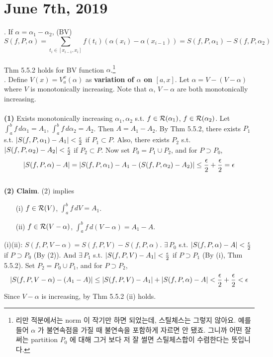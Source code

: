 \section*{June 7th, 2019}
\rmk. If $\alpha = \alpha_1 - \alpha_2$, (BV) $$S(f, P, \alpha) = \sum_{t_i\in [x_{i-1}, x_i]}f(t_i)(\alpha(x_i)-\alpha(x_{i-1})) = S(f, P, \alpha_1) - S(f, P, \alpha_2)$$
\\
 Thm 5.5.2 holds for BV function $\alpha$.\footnote{리만 적분에서는 norm 이 작기만 하면 되었는데, 스틸체스는 그렇지 않아요. 예를 들어 $\alpha$ 가 불연속점을 가질 때 불연속을 포함하게 자르면 안 됐죠. 그니까 어떤 잘 써는 partition $P_0$ 에 대해 그거 보다 저 잘 썰면 스틸체스합이 수렴한다는 뜻입니다.}\\
\pf. Define $V(x) = V_a^x(\alpha)$ as \textbf{variation of $\alpha$ on $ [a, x] $}. Let $\alpha = V - (V-\alpha)$ where $V$ is monotonically increasing. Note that $\alpha$, $V-\alpha$ are both monotonically increasing.\\
\\
\textbf{(1)} Exists monotonically increasing $\alpha_1, \alpha_2$ s.t. $f\in \mathcal{R}(\alpha_1)$, $f\in \mathcal{R}(\alpha_2)$. Let $\int_a^b f\,d\alpha_1 = A_1$, $\int_a^b f\,d\alpha_2 = A_2$. Then $A = A_1-A_2$. By Thm 5.5.2, there exists $P_1$ s.t. $\left|S(f, P, \alpha_1) - A_1\right| < \frac{\epsilon}{2}$ if $P_1\subset P$. Also, there exists $P_2$ s.t. $\left|S(f, P, \alpha_2) - A_2\right| < \frac{\epsilon}{2}$ if $P_2\subset P$. Now set $P_0 = P_1\cup P_2$, and for $P \supset P_0$, 
$$\left|S(f, P, \alpha) - A\right| = \left|S(f, P, \alpha_1)- A_1 -(S(f, P, \alpha_2) - A_2)\right| \leq \frac{\epsilon}{2} + \frac{\epsilon}{2}  =\epsilon$$\\
\textbf{(2)} \textbf{Claim}. (2) implies
\begin{enumerate}
	\item[(i)] $f\in \mathcal{R}(V)$, $\int_a^b f\,dV = A_1$.
	\item[(ii)] $f\in \mathcal{R}(V-\alpha)$, $\int_a^b f\,d(V-\alpha) = A_1 - A$.
\end{enumerate}
(i)\mimp(ii): $S(f, P, V-\alpha) = S(f, P, V) - S(f, P, \alpha)$.
$\exists\,P_0$ s.t. $\left|S(f,P, \alpha) -A\right| < \frac{\epsilon}{2}$ if $P\supset P_0$ (By (2)). And $\exists\,P_1$ s.t. $\left|S(f, P, V)-A_1\right| < \frac{\epsilon}{2}$ if $P\supset P_1$ (By (i), Thm 5.5.2). Set $P_2 = P_0 \cup P_1$, and for $P\supset P_2$,
$$\left|S(f, P, V-\alpha) - (A_1-A)\right| \leq \left|S(f, P, V) - A_1\right| + \left|S(f, P, \alpha) - A\right| < \frac{\epsilon}{2} + \frac{\epsilon}{2} < \epsilon$$
Since $V-\alpha$ is increasing, by Thm 5.5.2 (ii) holds.\\
